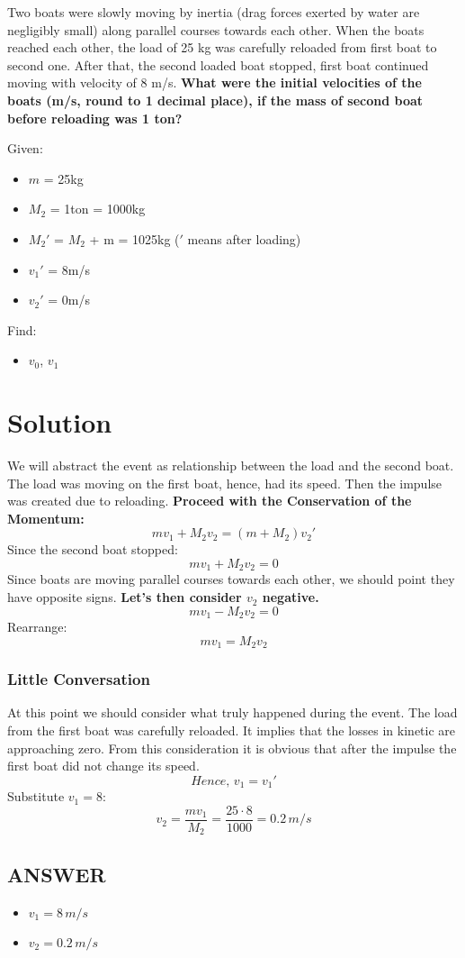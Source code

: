 Two boats were slowly moving by inertia (drag forces exerted by water are negligibly small) along parallel courses towards each other. When the boats reached each other, the load of 25 kg was carefully reloaded from first boat to second one. After that, the second loaded boat stopped, first boat continued moving with velocity of 8 m/s. \textbf{What were the initial velocities of the boats (m/s, round to 1 decimal place), if the mass of second boat before reloading was 1 ton?}

\bigbreak Given:
\begin{itemize}
    \item $m$ = 25kg
    \item $M_2$ = 1ton = 1000kg
    \item $M_2'$ = $M_2$ + m = 1025kg ($'$ means after loading)
    \item $v_1'$ = 8m/s
    \item $v_2'$ = 0m/s
\end{itemize}

\bigbreak Find:
\begin{itemize}
    \item $v_0$, $v_1$
\end{itemize}

\section*{Solution}
We will abstract the event as relationship between the load and the second boat.
The load was moving on the first boat, hence, had its speed. Then the impulse was created due to reloading.
\textbf{Proceed with the Conservation of the Momentum:}
$$ m v_1 + M_2 v_2 = (m + M_2) v_2' $$
Since the second boat stopped:
\[ m v_1 + M_2 v_2 = 0 \]
Since boats are moving parallel courses towards each other, we should point they have opposite signs.
\textbf{Let's then consider $v_2$ negative.}
\[ m v_1 - M_2 v_2 = 0 \]
Rearrange:
\[ m v_1 = M_2 v_2 \]
\subsubsection*{Little Conversation}
At this point we should consider what truly happened during the event. The load from the first boat was carefully reloaded.
It implies that the losses in kinetic are approaching zero. 
From this consideration it is obvious that after the impulse the first boat did not change its speed.  $$ \textit{Hence, } v_1 = v_1' $$
Substitute $ v_1 = 8$:
$$ v_2 = \frac{mv_1}{M_2} = \frac{25 \cdot 8}{1000} = \boxed{0.2 \, m/s} $$


\vfill \subsection*{ANSWER}
\begin{itemize}
    \item $v_1 = 8 \, m/s $
    \item $v_2 = 0.2 \, m/s$
\end{itemize}